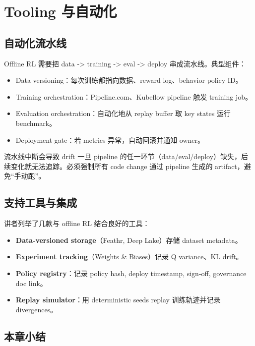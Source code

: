 \documentclass[a4paper]{article}
\begin{document}
\section{Tooling 与自动化}

\subsection{自动化流水线}

Offline RL 需要把 data -> training -> eval -> deploy 串成流水线。典型组件：

\begin{itemize}
    \item Data versioning：每次训练都指向数据、reward log、behavior policy ID。
    \item Training orchestration：Pipeline.com、Kubeflow pipeline 触发 training job。
    \item Evaluation orchestration：自动化地从 replay buffer 取 key states 运行 benchmark。
    \item Deployment gate：若 metrics 异常，自动回滚并通知 owner。
\end{itemize}

\begin{warningbox}{流水线中断会导致 drift}
一旦 pipeline 的任一环节（data/eval/deploy）缺失，后续变化就无法追踪。必须强制所有 code change 通过 pipeline 生成的 artifact，避免“手动跑”。
\end{warningbox}

\subsection{支持工具与集成}

讲者列举了几款与 offline RL 结合良好的工具：

\begin{itemize}
    \item \textbf{Data-versioned storage}（Feathr, Deep Lake）存储 dataset metadata。
    \item \textbf{Experiment tracking}（Weights & Biases）记录 Q variance、KL drift。
    \item \textbf{Policy registry}：记录 policy hash, deploy timestamp, sign-off, governance doc link。
    \item \textbf{Replay simulator}：用 deterministic seeds replay 训练轨迹并记录 divergences。
\end{itemize}

\subsection{本章小结}
\end{document}
